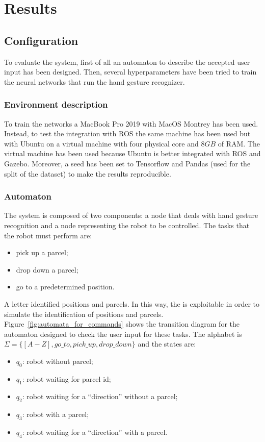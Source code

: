 \documentclass[../thesis.tex]{subfiles}
\begin{document}
\chapter{Results}\label{cap:results}
\section{Configuration}
To evaluate the system, first of all an automaton to describe the accepted user input has been designed. Then, several hyperparameters have been tried to train the neural networks that run the hand gesture recognizer.

\subsection{Environment description}
To train the networks a MacBook Pro 2019 with MacOS Montrey has been used. Instead, to test the integration with ROS the same machine has been used but with Ubuntu on a virtual machine with four physical core and $8GB$ of RAM. The virtual machine has been used because Ubuntu is better integrated with \acrshort{ROS} and Gazebo. Moreover, a seed has been set to Tensorflow and Pandas (used for the split of the dataset) to make the results reproducible.

\subsection{Automaton}\label{ss:automaton_description}
The system is composed of two components: a node that deals with  hand gesture recognition and a node representing the robot to be controlled. The tasks that the robot must perform are:
\begin{itemize}
    \item pick up a parcel;
    \item drop down a parcel;
    \item go to a predetermined position.
\end{itemize}
A letter identified positions and parcels. In this way, the  is exploitable in order to simulate the identification of positions and parcels.\\
Figure~\ref{fig:automata_for_commands} shows the transition diagram for the automaton designed to check the user input for these tasks. The alphabet is $\Sigma = \{[A-Z], go\_to, pick\_up, drop\_down\}$ and the states are:
\begin{itemize}
    \item \textbf{$q_0$}: robot without parcel; 
    \item \textbf{$q_1$}: robot waiting for parcel id; 
    \item \textbf{$q_2$}: robot waiting for a ``direction'' without a parcel;
    \item \textbf{$q_3$}: robot with a parcel;
    \item \textbf{$q_4$}: robot waiting for a ``direction'' with a parcel.
\end{itemize}
\end{document}
